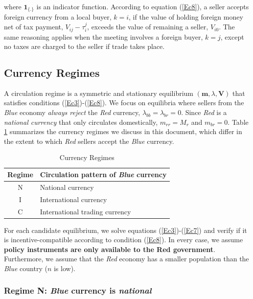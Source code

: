 where $\textbf{1}_{\{.\}}$ is an indicator function. According to equation (\ref{Ec8}), a seller accepts foreign currency from a local buyer, $k=i$, if the value of holding foreign money net of tax payment, $V_{ij}-\tau_i^j$, exceeds the value of remaining a seller, $V_{i0}$. The same reasoning applies when the meeting involves a foreign buyer, $k=j$, except no taxes are charged to the seller if trade takes place.

\subsection{Currency Regimes}
A circulation regime is a symmetric and stationary equilibrium $(\textbf{m},\lambda,\textbf{V})$ that satisfies conditions (\ref{Ec3})-(\ref{Ec8}). We focus on equilibria where sellers from the \textit{Blue} economy \textit{always reject} the \textit{Red} currency, $\lambda_{bb}=\lambda_{br}=0$. Since \textit{Red} is a \textit{national currency} that only circulates domestically, $m_{rr}=M_r$ and $m_{br}=0$. Table \ref{Table2} summarizes the currency regimes we discuss in this document, which differ in the extent to which \textit{Red} sellers accept the \textit{Blue} currency.

\begin{table}[ht]
\caption{Currency Regimes}
\centering
\begin{tabular}{cl}
\hline
    Regime  & Circulation pattern of \textit{Blue} currency \\ \hline
    N & National currency                   \\
    I  & International currency             \\
    C & International trading currency      \\ \hline
\end{tabular}
\label{Table2}
\end{table}
For each candidate equilibrium, we solve equations (\ref{Ec3})-(\ref{Ec7}) and verify if it is incentive-compatible according to condition (\ref{Ec8}). In every case, we assume \textbf{policy instruments are only available to the Red government}. Furthermore, we assume that the \textit{Red} economy has a smaller population than the \textit{Blue} country ($n$ is low). 


\subsubsection{Regime N: \textit{Blue} currency is \textit{national}}

